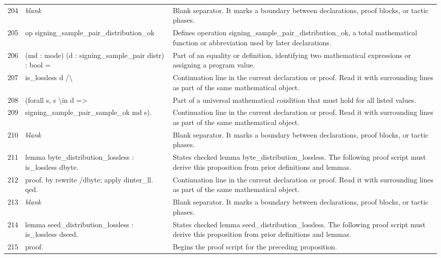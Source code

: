 \documentclass[10pt]{article}
\begin{document}
\begin{longtable}{r L{0.53\textwidth} L{0.37\textwidth}}
204 & {\ttfamily\scriptsize \emph{blank}} & Blank separator.  It marks a boundary between declarations, proof blocks, or tactic phases. \\
205 & {\ttfamily\scriptsize op signing\_sample\_pair\_distribution\_ok} & Defines operation signing\_sample\_pair\_distribution\_ok, a total mathematical function or abbreviation used by later declarations. \\
206 & {\ttfamily\scriptsize    (md : mode) (d : signing\_sample\_pair distr) : bool =} & Part of an equality or definition, identifying two mathematical expressions or assigning a program value. \\
207 & {\ttfamily\scriptsize   is\_lossless d /\textbackslash{}} & Continuation line in the current declaration or proof.  Read it with surrounding lines as part of the same mathematical object. \\
208 & {\ttfamily\scriptsize   (forall s, s \textbackslash{}in d =>} & Part of a universal mathematical condition that must hold for all listed values. \\
209 & {\ttfamily\scriptsize      signing\_sample\_pair\_sample\_ok md s).} & Continuation line in the current declaration or proof.  Read it with surrounding lines as part of the same mathematical object. \\
210 & {\ttfamily\scriptsize \emph{blank}} & Blank separator.  It marks a boundary between declarations, proof blocks, or tactic phases. \\
211 & {\ttfamily\scriptsize lemma byte\_distribution\_lossless : is\_lossless dbyte.} & States checked lemma byte\_distribution\_lossless.  The following proof script must derive this proposition from prior definitions and lemmas. \\
212 & {\ttfamily\scriptsize proof. by rewrite /dbyte; apply dinter\_ll. qed.} & Continuation line in the current declaration or proof.  Read it with surrounding lines as part of the same mathematical object. \\
213 & {\ttfamily\scriptsize \emph{blank}} & Blank separator.  It marks a boundary between declarations, proof blocks, or tactic phases. \\
214 & {\ttfamily\scriptsize lemma seed\_distribution\_lossless : is\_lossless dseed.} & States checked lemma seed\_distribution\_lossless.  The following proof script must derive this proposition from prior definitions and lemmas. \\
215 & {\ttfamily\scriptsize proof.} & Begins the proof script for the preceding proposition. \\

\end{longtable}
\end{document}
